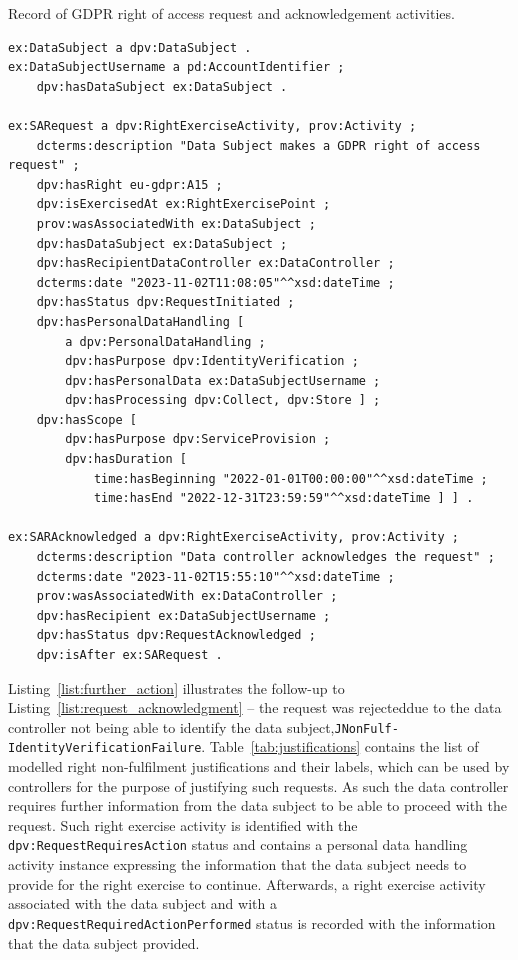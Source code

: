 \begin{listing}[htp]
\caption{Record of GDPR right of access request and acknowledgement activities.}
\label{list:request_acknowledgment}
\begin{verbatim}
ex:DataSubject a dpv:DataSubject .
ex:DataSubjectUsername a pd:AccountIdentifier ;
    dpv:hasDataSubject ex:DataSubject .

ex:SARequest a dpv:RightExerciseActivity, prov:Activity ;
    dcterms:description "Data Subject makes a GDPR right of access request" ;
    dpv:hasRight eu-gdpr:A15 ;
    dpv:isExercisedAt ex:RightExercisePoint ;
    prov:wasAssociatedWith ex:DataSubject ;
    dpv:hasDataSubject ex:DataSubject ;
    dpv:hasRecipientDataController ex:DataController ;
    dcterms:date "2023-11-02T11:08:05"^^xsd:dateTime ;
    dpv:hasStatus dpv:RequestInitiated ;
    dpv:hasPersonalDataHandling [
        a dpv:PersonalDataHandling ;
        dpv:hasPurpose dpv:IdentityVerification ;
        dpv:hasPersonalData ex:DataSubjectUsername ;
        dpv:hasProcessing dpv:Collect, dpv:Store ] ;
    dpv:hasScope [
        dpv:hasPurpose dpv:ServiceProvision ;
        dpv:hasDuration [
            time:hasBeginning "2022-01-01T00:00:00"^^xsd:dateTime ;
            time:hasEnd "2022-12-31T23:59:59"^^xsd:dateTime ] ] .

ex:SARAcknowledged a dpv:RightExerciseActivity, prov:Activity ;
    dcterms:description "Data controller acknowledges the request" ;
    dcterms:date "2023-11-02T15:55:10"^^xsd:dateTime ;
    prov:wasAssociatedWith ex:DataController ;
    dpv:hasRecipient ex:DataSubjectUsername ;
    dpv:hasStatus dpv:RequestAcknowledged ;
    dpv:isAfter ex:SARequest .
\end{verbatim}
\end{listing}

Listing~\ref{list:further_action} illustrates the follow-up to Listing~\ref{list:request_acknowledgment} -- the request was rejected\linebreak due to the data controller not being able to identify the data subject,\linebreak \texttt{JNonFulf-IdentityVerificationFailure}.
Table~\ref{tab:justifications} contains the list of modelled right non-fulfilment justifications and their labels, which can be used by controllers for the purpose of justifying such requests.
As such the data controller requires further information from the data subject to be able to proceed with the request.
Such right exercise activity is identified with the \texttt{dpv:RequestRequiresAction} status and contains a personal data handling activity instance expressing the information that the data subject needs to provide for the right exercise to continue.
Afterwards, a right exercise activity associated with the data subject and with a \texttt{dpv:RequestRequiredActionPerformed} status is recorded with the information that the data subject provided.

